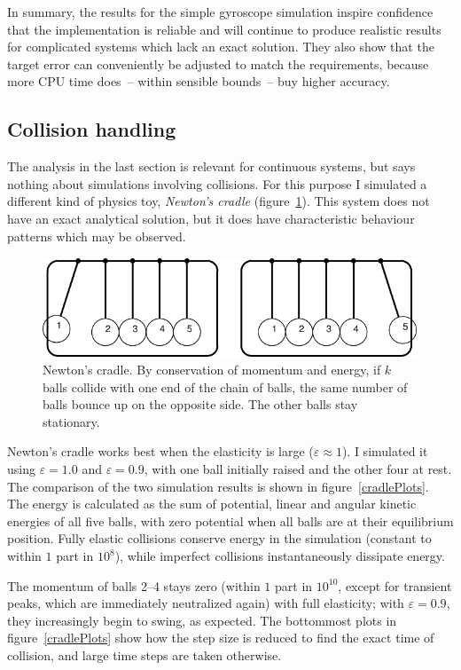 In summary, the results for the simple gyroscope simulation inspire confidence that the
implementation is reliable and will continue to produce realistic results for complicated systems
which lack an exact solution. They also show that the target error can conveniently be adjusted
to match the requirements, because more CPU time does~-- within sensible bounds~-- buy higher
accuracy.


\subsection{Collision handling\label{evalCollisions}}

The analysis in the last section is relevant for continuous systems, but says nothing about
simulations involving collisions. For this purpose I simulated a different kind of physics toy,
\emph{Newton's cradle} (figure~\ref{cradleFigure}). This system does not have an exact analytical
solution, but it does have characteristic behaviour patterns which may be observed.

\begin{figure}
\centerline{\includegraphics{figures/cradle}}
\caption{Newton's cradle. By conservation of momentum and energy, if $k$ balls collide with one
    end of the chain of balls, the same number of balls bounce up on the opposite side. The other
    balls stay stationary.\label{cradleFigure}}
\end{figure}

Newton's cradle works best when the elasticity is large ($\varepsilon \approx 1$). I simulated
it using $\varepsilon = 1.0$ and $\varepsilon = 0.9$, with one ball initially raised and the other
four at rest. The comparison of the two simulation results is shown in figure~\ref{cradlePlots}.
The energy is calculated as the sum of potential, linear and angular kinetic energies of all five
balls, with zero potential when all balls are at their equilibrium position. Fully elastic
collisions conserve energy in the simulation (constant to within $1$ part in $10^8$), while
imperfect collisions instantaneously dissipate energy.

The momentum of balls 2--4 stays zero (within $1$ part in $10^{10}$, except for transient peaks,
which are immediately neutralized again) with full elasticity; with $\varepsilon = 0.9$, they
increasingly begin to swing, as expected. The bottommost plots in figure~\ref{cradlePlots}
show how the step size is reduced to find the exact time of collision, and large time steps
are taken otherwise.

